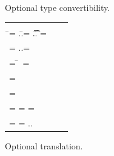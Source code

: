 \documentclass[a4paper,USenglish]{tex/lipics-v2016}
\begin{document}
\begin{figure}[hb]
	\hrulefill  \small  \vspace{-3mm}
	
	\begin{mathpar}
		
		
	\end{mathpar}
	\vspace{-8mm}
	
	\hrulefill\caption{Optional type convertibility.}\label{tsts2}
\end{figure}


\begin{figure}[hb]	
	\hrulefill
	
	\smallskip
	
	\begin{tabular}{@{}l@{~ ~ ~ ~~~~~~~~~~~~~~~~~~~~~~~~~~~~~~~~~~~~}ll}
		\small
		\begin{minipage}{8cm}  
			\begin{tabbing}
				\TR{\Class \C{\fd[1]..}{\md[1] .. } } = \src{ \Class \C{ \fdp[1]..}{\mdp[1]..}}\\ \HS\HS\HS\HS\HS\HS\HS\HS\HS\HS\HS\HS\HS\HS\HS\HS \WHERE\HS
				\=\fdp[1] = \src{\Ftype\f\any}..\HS\HS\=\fd[1] = \Ftype\f\t .. \HS\HS\=\md[1] = \Mdef\m\x{\t[1]}{\t[2]}\e \\
				\>\mdp[1] = \src{\Mdef\m\x\any\any\ep}..\HS\HS \>\>\ep = \TR{\e}
			\end{tabbing}
			\begin{tabbing}
				\TR{\FRead\f}\HS\HS\HS\HS\= = \src{\FRead\f}
				\\
				\TR{\FWrite\f\e} \> = \src{\FWrite\f\ep} \HS\HS\HS\HS\HS\=\WHERE~\ep=\TR\e
				\\
				\TR\this           \>= \src{\SubCast\any\this}
				\\
				\TR\x \> = \src \x
				\\
				\TR{\Call{\e[1]}\m{\e[2]}} \> = \src{\DynCall{\ep[1]}{\m}{\ep[2]}} \HS\>\WHERE\HS\ep[1] = \TR{ \e[1]} \HS \ep[2] = \TR{\e[2]}
				\\
				\TR{\New\C{\e[1]..}} \> = \src{\SubCast\any{\New\C{\ep[1]..}}} \HS \>\WHERE \HS   \ep[1] = \TR{\e[1]} ..
			\end{tabbing}
		\end{minipage}
	\end{tabular}
	
	\smallskip
	\hrulefill
	\caption{Optional translation.}\label{tst2}
	
\end{figure}
\end{document}
